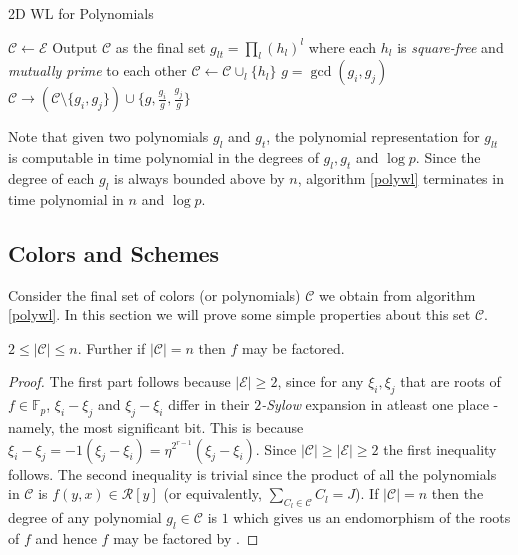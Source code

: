 	\begin{algorithm}[H]
		\caption{2D WL for Polynomials}
		\label{polywl}
		\begin{algorithmic}
			\State $\mathcal{C} \leftarrow \mathcal{E}$
			   \State Output $\mathcal{C}$ as the final set
			\Else
			   \State $g_{lt}= \prod_{l}(h_l)^l$ where each $h_l$ is \emph{square-free} and \emph{mutually prime} to each other
			   \State $\mathcal{C} \leftarrow \mathcal{C} \cup_{l} \{h_l\}$
			         \State $g=\gcd(g_i,g_j)$
				 \State $\mathcal{C} \rightarrow (\mathcal{C} \setminus \{g_i,g_j\}) \cup \{g,\frac{g_i}{g},\frac{g_j}{g}\}$
			   \EndWhile
			\EndIf
			\EndWhile
		\end{algorithmic}
	\end{algorithm}

			
         Note that given two polynomials $g_l$ and $g_t$, the polynomial representation for $g_{lt}$ is computable in time polynomial in the degrees of $g_l,g_t$ and $\log{p}$. Since the degree of each $g_l$ is always bounded above
	 by $n$, algorithm \ref{polywl} terminates in time polynomial in $n$ and $\log{p}$. 
	 
	 
	 \subsection{Colors and Schemes}\label{sec:scheme}
	 Consider the final set of colors (or polynomials) $\mathcal{C}$ we obtain from algorithm \ref{polywl}. In this section we will prove some simple properties about this set $\mathcal{C}$.

	 \begin{lemma}\label{thin}
		 $2 \le |\mathcal{C}| \le n$. Further if $|\mathcal{C}|=n$ then $f$ may be factored.
	 \end{lemma}

	 \begin{proof}
		The first part follows because $|\mathcal{E}| \ge 2$, since for any $\xi_i,\xi_j$ that are roots of $f \in \mathbb{F}_p$, $\xi_i-\xi_j$ and $\xi_j-\xi_i$ differ in their \emph{$2$-Sylow} expansion in atleast one place
		- namely, the most significant bit. This is because $\xi_i-\xi_j = -1(\xi_j-\xi_i) = \eta^{2^{r-1}} (\xi_j-\xi_i)$. Since $|\mathcal{C}| \ge |\mathcal{E}| \ge 2$ the first inequality follows. The second inequality 
		is trivial since the product of all the polynomials in $\mathcal{C}$ is $f(y,x) \in \mathcal{R}[y]$ (or equivalently, $\sum_{C_l \in \mathcal{C}} C_l = J$). If $|\mathcal{C}|=n$ then the degree of any polynomial
		$g_l \in \mathcal{C}$ is $1$ which gives us an endomorphism of the roots of $f$ and hence $f$ may be factored by \cite{evdokimov}.
	\end{proof}


